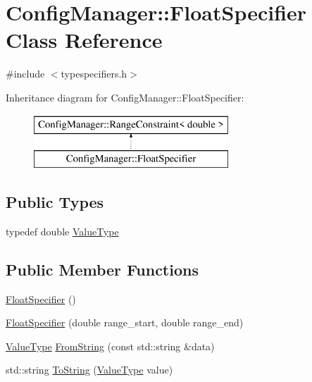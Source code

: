 \hypertarget{class_config_manager_1_1_float_specifier}{}\section{Config\+Manager\+:\+:Float\+Specifier Class Reference}
\label{class_config_manager_1_1_float_specifier}


{\ttfamily \#include $<$typespecifiers.\+h$>$}

Inheritance diagram for Config\+Manager\+:\+:Float\+Specifier\+:\begin{figure}[H]
\begin{center}
\leavevmode
\includegraphics[height=2.000000cm]{class_config_manager_1_1_float_specifier}
\end{center}
\end{figure}
\subsection*{Public Types}
\begin{DoxyCompactItemize}
\item 
typedef double \hyperlink{class_config_manager_1_1_float_specifier_aa31aedae65d89c1c14d9b0aa6fbe697b}{Value\+Type}
\end{DoxyCompactItemize}
\subsection*{Public Member Functions}
\begin{DoxyCompactItemize}
\item 
\hyperlink{class_config_manager_1_1_float_specifier_aeaefabf4a53b45d70575e50a16ecff95}{Float\+Specifier} ()
\item 
\hyperlink{class_config_manager_1_1_float_specifier_a841c065d50fdedccac00822b4bc36e65}{Float\+Specifier} (double range\+\_\+start, double range\+\_\+end)
\item 
\hyperlink{class_config_manager_1_1_float_specifier_aa31aedae65d89c1c14d9b0aa6fbe697b}{Value\+Type} \hyperlink{class_config_manager_1_1_float_specifier_a557eaa40035aa402e0f4cd24e3ed5e17}{From\+String} (const std\+::string \&data)
\item 
std\+::string \hyperlink{class_config_manager_1_1_float_specifier_a161a99d1f205292ce0b4a17bb0a8daeb}{To\+String} (\hyperlink{class_config_manager_1_1_float_specifier_aa31aedae65d89c1c14d9b0aa6fbe697b}{Value\+Type} value)
\end{DoxyCompactItemize}


